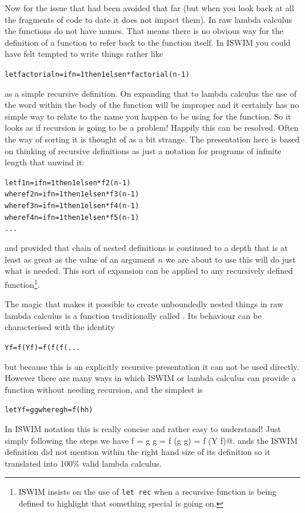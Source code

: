 Now for the issue that had been avoided that far (but when you look back
at all the fragments of code to date it does not impact them). In raw
lambda calculus the functions do not have names. That means there is no
obvious way for the definition of a function to refer back to the function
itself. In ISWIM you could have felt tempted to write things rather like
\begin{alltt}
  let factorial n = if n=1 then 1 else n*factorial(n-1)
\end{alltt}
as a simple recursive definition. On expanding that to lambda
calculus the use of the word \verb@factorial@ within the body
of the function will be improper and it certainly has no simple
way to relate to the name you happen to be using for the function.
So it looks as if recursion is going to be a problem! Happily this
can be resolved. Often the way of sorting it is thought of as a bit
strange. The presentation here is based on thinking of recursive
definitions as just a notation for programs of infinite length
that unwind it:
\begin{alltt}
  let f1 n = if n=1 then 1 else n*f2(n-1)
    where f2 n = if n=1 then 1 else n*f3(n-1)
      where f3 n = if n=1 then 1 else n*f4(n-1)
        where f4 n = if n=1 then 1 else n*f5(n-1)
          ...
\end{alltt}
and provided that chain of nested definitions is continued to
a depth that is at least as great as the value of an argument $n$ we are
about to use this will do just what is needed. This sort of expansion
can be applied to any recursively defined function\footnote{
ISWIM insists on the use of \texttt{let rec} when a recursive function is
being defined to highlight that something special is going on.}.

The magic that makes it possible to create unboundedly nested things in
raw lambda calculus is a function traditionally called \verb@Y@. Its
behaviour can be characterised with the identity
\begin{alltt}
   Y f = f (Y f) = f(f(f(...
\end{alltt}
but because this is an explicitly recursive presentation it can not be
used directly. However there are many ways in which ISWIM or lambda
calculus can provide a \verb@Y@ function without needing recursion,
and the simplest is
\begin{alltt}
  let Y f = g g where g h = f (h h)
\end{alltt}
In ISWIM notation this is really concise and rather easy to understand!
Just simply following the steps we have \verb@Y f = g g = f (g g) = f (Y f)@.
ands the ISWIM definition did not mention \verb@Y@ within the right hand
size of its definition so it translated into 100\% valid lambda calculus.

